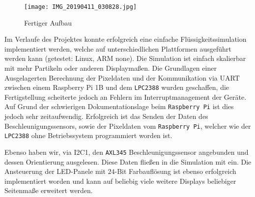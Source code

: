 \begin{wrapfigure}{r}{0.5\textwidth}
	\centering
	\texttt{[image: IMG\_20190411\_030828.jpg]}
	\caption{Fertiger Aufbau}
	\label{fig:result}
\end{wrapfigure}

Im Verlaufe des Projektes konnte erfolgreich eine einfache Flüssigkeitssimulation implementiert werden, welche auf unterschiedlichen Plattformen ausgeführt werden kann (getestet: Linux, ARM none). Die Simulation ist einfach skalierbar mit mehr Partikeln oder anderen Displaymaßen. Die Grundlagen einer Ausgelagerten Berechnung der Pixeldaten und der Kommunikation via UART zwischen einem Raspberry Pi 1B und dem \texttt{LPC2388} wurden geschaffen, die Fertigstellung scheiterte jedoch an Fehlern im Interruptmanagement der Geräte. Auf Grund der schwierigen Dokumentationslage beim \texttt{Raspberry Pi} ist dies jedoch sehr zeitaufwendig. Erfolgreich ist das Senden der Daten des Beschleunigungssensors, sowie der Pixeldaten vom \texttt{Raspberry Pi}, welcher wie der \texttt{LPC2388} ohne Betriebssystem programmiert worden ist.

Ebenso haben wir, via I2C1, den \texttt{AXL345} Beschleunigungssensor angebunden und dessen Orientierung ausgelesen. Diese Daten fließen in die Simulation mit ein. Die Ansteuerung der LED-Panele mit $24$-Bit Farbauflösung ist ebenso erfolgreich implementiert worden und kann auf beliebig viele weitere Displays beliebiger Seitenmaße erweitert werden.